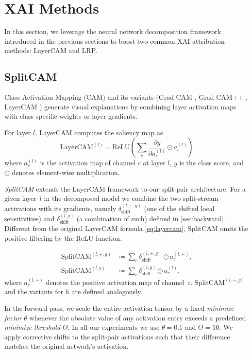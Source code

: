 \section{XAI Methods}\label{sec:methods_xai}

In this section, we leverage the neural network decomposition framework introduced in the previous sections to boost two common XAI attribution methods: LayerCAM and LRP.

\subsection{SplitCAM}\label{subsec:split_cam}

Class Activation Mapping (CAM) \citep{Zhou2016} and its variants (Grad-CAM \citep{Selvaraju2017}, Grad-CAM++ \citep{Chattopadhay2018}, LayerCAM \citep{Jiang2021LayerCAM}) generate visual explanations by combining layer activation maps with class specific weights or layer gradients.

For layer $l$, LayerCAM computes the saliency map as
\begin{equation} \label{eq:layercam}
    \text{LayerCAM}^{(l)} = \text{ReLU}\left(\sum_{c} \frac{\partial y}{\partial a^{(l)}_c} \odot a^{(l)}_c\right)
\end{equation}
where $a^{(l)}_c$ is the activation map of channel $c$ at layer $l$, $y$ is the class score, and $\odot$ denotes element-wise multiplication.

\emph{SplitCAM} extends the LayerCAM framework to our split-pair architecture.
For a given layer~$l$ in the decomposed model we combine the two split-stream activations with its gradients, namely $\delta_{\text{shift}}^{(l,+,g)}$ (one of the shifted local sensitivities) and $\delta_{\text{shift}}^{(l,g)}$ (a combination of such) defined in \cref{sec:backward}. Different from the original LayerCAM formula \cref{eq:layercam}, SplitCAM omits the positive filtering by the ReLU function.

\begin{align}
    \text{SplitCAM}^{(l, +, g)} &\coloneqq \sum_{c} \delta_{\text{shift}}^{(l,+,g)} \odot a^{(l,+)}_c, \\
    \text{SplitCAM}^{(l, g)} &\coloneqq \sum_{c} \delta_{\text{shift}}^{(l,g)} \odot a^{(l)}_c,
\end{align}
where $a^{(l,+)}_c$ denotes the positive activation map of channel~$c$.
$\text{SplitCAM}^{(l, -, g)}$ and the variants for $h$ are defined analogously.

In the forward pass, we scale the entire activation tensor by a fixed \emph{minimize factor} $\theta$ whenever the absolute value of any activation entry exceeds a predefined \emph{minimize threshold} $\Theta$.
In all our experiments we use $\theta = 0.1$ and $\Theta = 10$.
We apply corrective shifts to the split-pair activations such that their difference matches the original network's activation.

